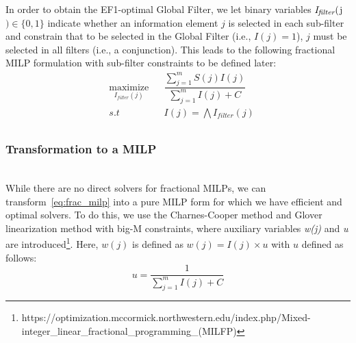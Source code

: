 In order to obtain the EF1-optimal Global Filter, we let binary variables $\emph{I\textsubscript{filter}}($j$) \in \{0, 1\}$ indicate whether an information element $j$ is selected in each sub-filter and constrain that to be selected in the Global Filter (i.e., $I(j)=1$), $j$ must be selected in all filters (i.e., a conjunction).  This leads to the following fractional MILP formulation with sub-filter constraints to be defined later:
\begin{equation}
\begin{aligned}
& \underset{I_{\mathit{filter}}(j)}{\text{maximize}}
& & \dfrac{\sum_{j=1}^m S(j)I(j)}{\sum_{j=1}^m I(j) + C} \\
& s.t
& & I(j) = \bigwedge I_{\mathit{filter}}(j) \\
\end{aligned} \label{eq:frac_milp}
\end{equation}


\subsubsection{Transformation to a MILP} \hfill \\
While there are no direct solvers for fractional MILPs, we can transform~\eqref{eq:frac_milp} into a pure MILP form for which we have efficient and optimal solvers.  To do this, we use the Charnes-Cooper method \cite{Charnes1962} and Glover linearization method \cite{Glover1975} with big-M constraints, where auxiliary variables \emph{w(j)} and \emph{u} are  introduced\footnote{https://optimization.mccormick.northwestern.edu/index.php/Mixed-integer\_linear\_fractional\_programming\_(MILFP)}. Here, $w(j)$ is defined as $w(j)=I(j)\times u$ with $u$ defined as follows:
\begin{equation}
u = \dfrac{1}{\sum_{j=1}^m I(j) + C}
\end{equation}

